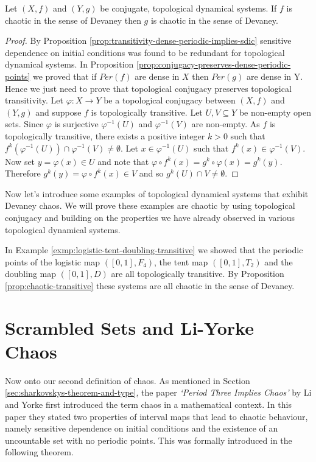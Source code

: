 \begin{prop}
    Let $(X, f)$ and $(Y, g)$ be conjugate, topological dynamical systems. If $f$ is chaotic in the sense of Devaney then $g$ is chaotic in the sense of Devaney.
    \begin{proof}
        By Proposition \ref{prop:transitivity-dense-periodic-implies-sdic} sensitive dependence on initial conditions was found to be redundant for topological dynamical systems. In Proposition \ref{prop:conjugacy-preserves-dense-periodic-points} we proved that if $Per(f)$ are dense in $X$ then $Per(g)$ are dense in Y. Hence we just need to prove that topological conjugacy preserves topological transitivity. Let $\varphi: X \to Y$ be a topological conjugacy between $(X, f)$ and $(Y, g)$ and suppose $f$ is topologically transitive. Let $U, V \subseteq Y$ be non-empty open sets. Since $\varphi$ is surjective $\varphi^{-1}(U)$ and $\varphi^{-1}(V)$ are non-empty. As $f$ is topologically transitive, there exists a positive integer $k > 0$ such that $f^k(\varphi^{-1}(U)) \cap \varphi^{-1}(V) \neq \emptyset$. Let $x \in \varphi^{-1}(U)$ such that $f^k(x) \in \varphi^{-1}(V)$. Now set $y = \varphi(x) \in U$ and note that $\varphi \circ f^k(x) = g^k \circ \varphi(x) = g^k(y)$. Therefore $g^k(y) = \varphi \circ f^k(x) \in V$ and so $g^k(U) \cap V \neq \emptyset$.
    \end{proof}
\end{prop}

Now let's introduce some examples of topological dynamical systems that exhibit Devaney chaos. We will prove these examples are chaotic by using topological conjugacy and building on the properties we have already observed in various topological dynamical systems.

\begin{exmp}
    In Example \ref{exmp:logistic-tent-doubling-transitive} we showed that the periodic points of the logistic map $([0, 1], F_4)$, the tent map $([0, 1], T_2)$ and the doubling map $([0, 1], D)$ are all topologically transitive. By Proposition \ref{prop:chaotic-transitive} these systems are all chaotic in the sense of Devaney.
\end{exmp}

\section{Scrambled Sets and Li-Yorke Chaos} \label{sec:li-yorke-chaos}

Now onto our second definition of chaos. As mentioned in Section \ref{sec:sharkovskys-theorem-and-type}, the paper \emph{`Period Three Implies Chaos'} by Li and Yorke \cite{li-yorke} first introduced the term chaos in a mathematical context. In this paper they stated two properties of interval maps that lead to chaotic behaviour, namely sensitive dependence on initial conditions and the existence of an uncountable set with no periodic points. This was formally introduced in the following theorem.

